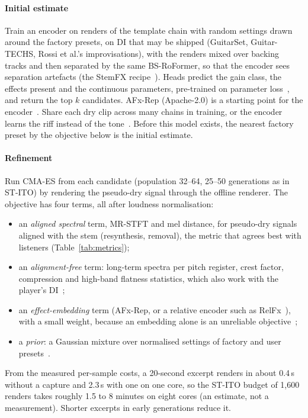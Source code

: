 \paragraph{Initial estimate} Train an encoder on renders of the template chain
with random settings drawn around the factory presets, on DI that may be
shipped (GuitarSet, Guitar-TECHS, Rossi et al.'s improvisations), with the
renders mixed over backing tracks and then separated by the same BS-RoFormer,
so that the encoder sees separation artefacts (the StemFX recipe~\cite{cheng2026stemfx}).
Heads predict the gain class, the effects present and the continuous
parameters, pre-trained on parameter loss~\cite{masuda2021ddsp}, and return
the top $k$ candidates. AFx-Rep (Apache-2.0) is a starting point for the
encoder~\cite{steinmetz2024stito}. Share each dry clip across many chains in
training, or the encoder learns the riff instead of the
tone~\cite{nathanben2026tonerunner}. Before this model exists, the nearest
factory preset by the objective below is the initial estimate.

\paragraph{Refinement} Run CMA-ES from each candidate (population 32--64,
25--50 generations as in ST-ITO) by rendering the pseudo-dry signal through
the offline renderer. The objective has four terms, all after loudness
normalisation:
\begin{itemize}
\item an \emph{aligned spectral} term, MR-STFT and mel distance, for pseudo-dry
signals aligned with the stem (resynthesis, removal), the metric that agrees
best with listeners (Table~\ref{tab:metrics});
\item an \emph{alignment-free} term: long-term spectra per pitch register,
crest factor, compression and high-band flatness statistics, which also work
with the player's DI~\cite{sd4562026nameqmatch};
\item an \emph{effect-embedding} term (AFx-Rep, or a relative encoder such as
RelFx~\cite{liu2026beyond}), with a small weight, because an embedding alone
is an unreliable objective~\cite{long2026tape};
\item a \emph{prior}: a Gaussian mixture over normalised settings of factory
and user presets~\cite{yu2025improving}.
\end{itemize}
From the measured per-sample costs, a 20-second excerpt renders in about
0.4\,s without a capture and 2.3\,s with one on one core, so the ST-ITO budget
of 1,600 renders takes roughly 1.5 to 8 minutes on eight cores (an estimate,
not a measurement). Shorter excerpts in early generations reduce it.

